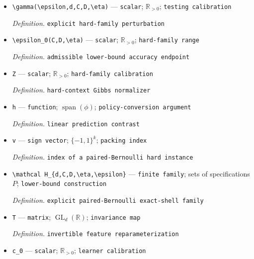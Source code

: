 \documentclass{article}
\begin{document}
\begin{itemize}
  \par\smallskip\noindent\emph{Definition.} \texttt{hard-\allowbreak{}context reward baseline}
  \item \texttt{\textbackslash{}\allowbreak{}gamma(\textbackslash{}\allowbreak{}epsilon,\allowbreak{}d,\allowbreak{}C,\allowbreak{}D,\allowbreak{}\textbackslash{}\allowbreak{}eta)} --- \texttt{scalar}; \(\mathbb R_{>0}\); \texttt{testing calibration}
  \par\smallskip\noindent\emph{Definition.} \texttt{explicit hard-\allowbreak{}family perturbation}
  \item \texttt{\textbackslash{}\allowbreak{}epsilon\_\allowbreak{}0(C,\allowbreak{}D,\allowbreak{}\textbackslash{}\allowbreak{}eta)} --- \texttt{scalar}; \(\mathbb R_{>0}\); \texttt{hard-\allowbreak{}family range}
  \par\smallskip\noindent\emph{Definition.} \texttt{admissible lower-\allowbreak{}bound accuracy endpoint}
  \item \texttt{Z} --- \texttt{scalar}; \(\mathbb R_{>0}\); \texttt{hard-\allowbreak{}family calibration}
  \par\smallskip\noindent\emph{Definition.} \texttt{hard-\allowbreak{}context Gibbs normalizer}
  \item \texttt{h} --- \texttt{function}; \(\operatorname{span}(\phi)\); \texttt{policy-\allowbreak{}conversion argument}
  \par\smallskip\noindent\emph{Definition.} \texttt{linear prediction contrast}
  \item \texttt{v} --- \texttt{sign vector}; \(\{-1,1\}^k\); \texttt{packing index}
  \par\smallskip\noindent\emph{Definition.} \texttt{index of a paired-\allowbreak{}Bernoulli hard instance}
  \item \texttt{\textbackslash{}\allowbreak{}mathcal H\_\allowbreak{}\{d,\allowbreak{}C,\allowbreak{}D,\allowbreak{}\textbackslash{}\allowbreak{}eta,\allowbreak{}\textbackslash{}\allowbreak{}epsilon\}\allowbreak{}} --- \texttt{finite family}; sets of specifications \(P\); \texttt{lower-\allowbreak{}bound construction}
  \par\smallskip\noindent\emph{Definition.} \texttt{explicit paired-\allowbreak{}Bernoulli exact-\allowbreak{}shell family}
  \item \texttt{T} --- \texttt{matrix}; \(\operatorname{GL}_d(\mathbb R)\); \texttt{invariance map}
  \par\smallskip\noindent\emph{Definition.} \texttt{invertible feature reparameterization}
  \item \texttt{c\_\allowbreak{}0} --- \texttt{scalar}; \(\mathbb R_{>0}\); \texttt{learner calibration}

\end{itemize}
\end{document}
